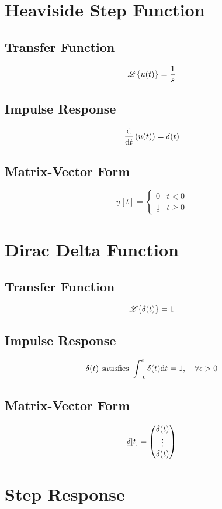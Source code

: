 \documentclass[8pt]{extarticle}
\begin{document}
\begin{multicols*}{3}
\section*{Heaviside Step Function}
\subsection*{Transfer Function}
\[
    \mathscr{L}\{u(t)\} = \frac{1}{s}
\]

\subsection*{Impulse Response}
\[
    \frac{\mathrm{d}}{\mathrm{d}t}\left(u(t)\right) = \delta(t)
\]

\subsection*{Matrix-Vector Form}
\[
    \underline{u}[t] =
    \begin{cases}
        \underline{0} & t < 0 \\
        \underline{1} & t \geq 0
    \end{cases}
\]

\section*{Dirac Delta Function}
\subsection*{Transfer Function}
\[
    \mathscr{L}\{\delta(t)\} = 1
\]

\subsection*{Impulse Response}
\[
    \delta(t) \text{ satisfies } \int_{-\epsilon}^{\epsilon} \delta(t) \mathrm{d}t = 1, \quad \forall \epsilon > 0
\]

\subsection*{Matrix-Vector Form}
\[
    \underline{\delta}[t] =
    \begin{pmatrix}
        \delta(t) \\
        \vdots \\
        \delta(t)
    \end{pmatrix}
\]

\section*{Step Response}

\end{multicols*}
\end{document}
